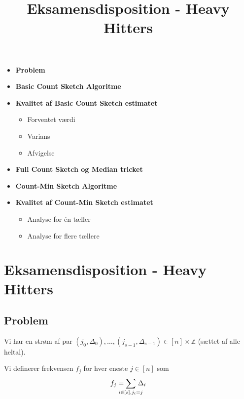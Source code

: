 
\title{Eksamensdisposition - Heavy Hitters}


\maketitle

\begin{itemize}
  \item \textbf{Problem}
  \item \textbf{Basic Count Sketch Algoritme}
  \item \textbf{Kvalitet af Basic Count Sketch estimatet}
  \begin{itemize}
    \item Forventet værdi
    \item Varians
    \item Afvigelse
  \end{itemize}
  \item \textbf{Full Count Sketch og Median tricket}
  \item \textbf{Count-Min Sketch Algoritme}
  \item \textbf{Kvalitet af Count-Min Sketch estimatet}
  \begin{itemize}
    \item Analyse for én tæller
    \item Analyse for flere tællere
  \end{itemize}
\end{itemize}


\newpage
\section{Eksamensdisposition - Heavy Hitters}

\subsection{Problem}

Vi har en strøm af par $(j_0, \Delta_0), \dots, (j_{s-1}, \Delta_{s-1}) \in [n]\times \mathbb Z$ (sættet af alle heltal).

Vi definerer frekvensen $f_j$ for hver eneste $j \in [n]$ som
$$
f_j = \summ{i \in [s], j_i = j} \, \Delta_i
$$

